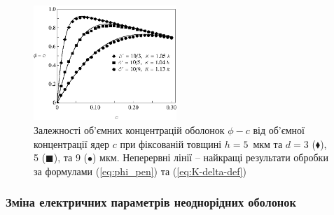 \documentclass[14pt,twoside]{vakthesis}
\begin{document}
\begin{figure}[t]
	\centering
		\includegraphics[width=0.48\textwidth]{SiekierskiShell_103-9.eps}
		\caption{Залежності об'ємних концентрацій оболонок $\phi-c$ від об'ємної концентрації ядер $c$ \cite{Siekierski2007} при фіксованій товщині $h=5$~мкм та  $d = 3$ ($\blacklozenge$), 5 ($\blacksquare$), та $9$ ($\bullet$) мкм. Неперервні лінії -- найкращі результати обробки за формулами (\ref{eq:phi_pen}) та (\ref{eq:K-delta-def})} \label{fig:simulations-phi-b}
\end{figure}


\subsubsection{Зміна електричних параметрів неоднорідних оболонок}
\end{document}
